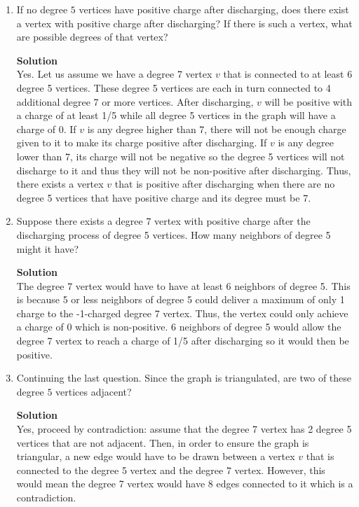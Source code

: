 \documentclass[11pt]{article}
\newenvironment{Parts}{\begin{enumerate}[label=(\alph*)]}{\end{enumerate}}
\newcommand*{\Part}{\item}
\newenvironment{Answer}{\vspace{10pt}\begin{mdframed}\textbf{Solution}\\}{\end{mdframed}\vfill\pagebreak[3]}
\newenvironment{Answer}{\vspace{10pt}}{\vfill\pagebreak[3]}
\begin{document}
\begin{Parts}
\Part If no degree $5$ vertices have positive charge after discharging, 
does there exist a vertex with positive charge after discharging?
If there is such a vertex, what are possible degrees of that vertex?

\begin{Answer}
Yes. Let us assume we have a degree 7 vertex $v$ that is connected to at least 6 degree 5 vertices. These degree 5 vertices are each in turn connected to 4 additional degree 7 or more vertices. After discharging, $v$ will be positive with a charge of at least 1/5 while all degree 5 vertices in the graph will have a charge of 0. If $v$ is any degree higher than 7, there will not be enough charge given to it to make its charge positive after discharging. If $v$ is any degree lower than 7, its charge will not be negative so the degree 5 vertices will not discharge to it and thus they will not be non-positive after discharging. Thus, there exists a vertex $v$ that is positive after discharging when there are no degree 5 vertices that have positive charge and its degree must be 7.
\end{Answer}

\Part 
Suppose there exists a degree $7$ vertex with positive charge after the discharging process of degree 5 vertices.
How many neighbors of degree 5 might it have?

\begin{Answer}
The degree 7 vertex would have to have at least 6 neighbors of degree 5. This is because 5 or less neighbors of degree 5 could deliver a maximum of only 1 charge to the -1-charged degree 7 vertex. Thus, the vertex could only achieve a charge of 0 which is non-positive. 6 neighbors of degree 5 would allow the degree 7 vertex to reach a charge of 1/5 after discharging so it would then be positive. 
\end{Answer}

\Part Continuing the last question. Since the graph is triangulated,
  are two of these degree $5$ vertices adjacent?

\begin{Answer}
Yes, proceed by contradiction: assume that the degree 7 vertex has 2 degree 5 vertices that are not adjacent. Then, in order to ensure the graph is triangular, a new edge would have to be drawn between a vertex $v$ that is connected to the degree 5 vertex and the degree 7 vertex. However, this would mean the degree 7 vertex would have 8 edges connected to it which is a contradiction. 
\end{Answer}


\end{Parts}
\end{document}
